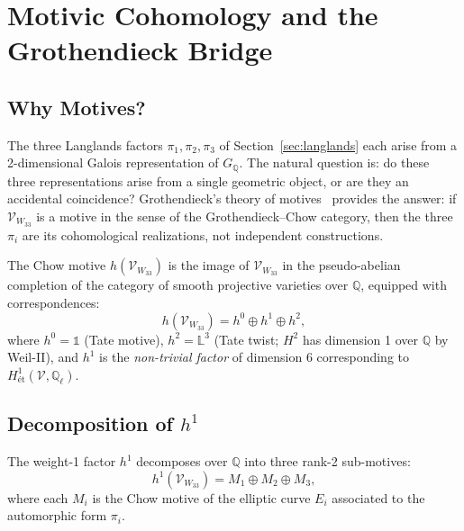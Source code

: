 %

\section{Motivic Cohomology and the Grothendieck Bridge}
\label{sec:motivic}

\subsection{Why Motives?}

The three Langlands factors $\pi_1,\pi_2,\pi_3$ of Section~\ref{sec:langlands}
each arise from a 2-dimensional Galois representation of $G_\mathbb{Q}$.
The natural question is: do these three representations arise from a
single geometric object, or are they an accidental coincidence? Grothendieck's
theory of motives~\cite{GrothendieckFrobenius} provides the answer:
if $\mathcal{V}_{W_{33}}$ is a motive in the sense of the
Grothendieck--Chow category, then the three $\pi_i$ are its
cohomological realizations, not independent constructions.

\begin{definition}
The Chow motive $h(\mathcal{V}_{W_{33}})$ is the image of
$\mathcal{V}_{W_{33}}$ in the pseudo-abelian completion of the category
of smooth projective varieties over $\mathbb{Q}$, equipped with
correspondences:
\begin{equation}
  h(\mathcal{V}_{W_{33}}) = h^0 \oplus h^1 \oplus h^2,
  \label{eq:motive_decomp}
\end{equation}
where $h^0=\mathbb{1}$ (Tate motive), $h^2=\mathbb{L}^3$ (Tate twist;
$H^2$ has dimension 1 over $\mathbb{Q}$ by Weil-II), and
$h^1$ is the \emph{non-trivial factor} of dimension 6 corresponding to
$H^1_{\text{\'et}}(\mathcal{V},\mathbb{Q}_\ell)$.
\end{definition}

\subsection{Decomposition of $h^1$}

The weight-1 factor $h^1$ decomposes over $\mathbb{Q}$ into three
rank-2 sub-motives:
\begin{equation}
  h^1(\mathcal{V}_{W_{33}}) = M_1 \oplus M_2 \oplus M_3,
  \label{eq:h1_decomp}
\end{equation}
where each $M_i$ is the Chow motive of the elliptic curve $E_i$
associated to the automorphic form $\pi_i$.

